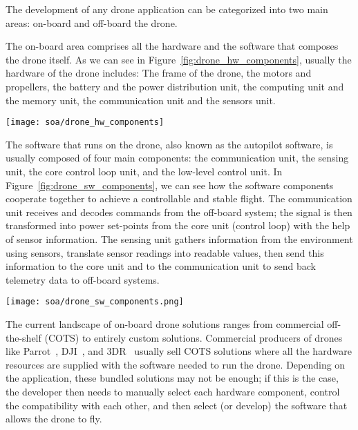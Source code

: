 The development of any drone application can be categorized into two main areas: on-board and off-board the drone.

The on-board area comprises all the hardware and the software that composes the drone itself. 
As we can see in Figure~\ref{fig:drone_hw_components}, usually the hardware of the drone includes: 
The frame of the drone, the motors and propellers, the battery and the power distribution unit, the computing unit and the memory unit,
the communication unit and the sensors unit.

\begin{SCfigure}[\sidecaptionrelwidth][tb]
    \texttt{[image: soa/drone\_hw\_components]}
    \caption[Drone hardware components]{The main hardware components of a drone are: 1. drone's frame, 2. motors, 3. propellers, 4. motor mount, 5. battery, 6. power distribution unit, 7. computing and memory unit, 8. communication unit, 9. sensors unit }
    \label{fig:drone_hw_components}
\end{SCfigure}

The software that runs on the drone, also known as the autopilot software, is usually composed of four main components: the communication unit, the sensing unit, the core control loop unit, and the low-level control unit. 
In Figure~\ref{fig:drone_sw_components}, we can see how the software components cooperate together to achieve a controllable and stable flight.
The communication unit receives and decodes commands from the off-board system; the signal is then transformed into power set-points from the core unit (control loop) with the help of sensor information. 
The sensing unit gathers information from the environment using sensors, translate 
sensor readings into readable values, then send this information to the core unit and to the communication unit to send back telemetry data to off-board systems.

\begin{SCfigure}[\sidecaptionrelwidth][tb]
    \texttt{[image: soa/drone\_sw\_components.png]}
    \caption[Drone software components]{
        The main software components of a drone are: 
        the \textit{sensing unit}, the \textit{communication unit} and the \textit{core unit (control loop)}.
    }\label{fig:drone_sw_components}
\end{SCfigure}

The current landscape of on-board drone solutions ranges from commercial off-the-shelf (COTS) to entirely custom solutions.
Commercial producers of drones like Parrot~\cite{parrot}, DJI~\cite{dij}, and 3DR~\cite{3DR} usually sell COTS solutions where all the hardware resources are supplied
with the software needed to run the drone.
Depending on the application, these bundled solutions may not be enough; if this is the case, 
the developer then needs to manually select each hardware component, control the compatibility with each other, 
and then select (or develop) the software that allows the drone to fly.

